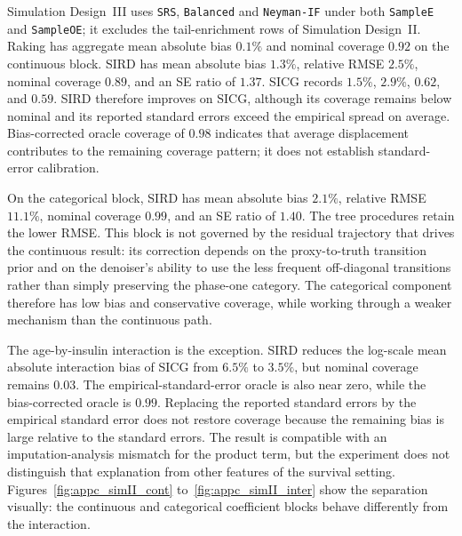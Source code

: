 Simulation Design~III uses \texttt{SRS}, \texttt{Balanced} and \texttt{Neyman-IF} under both \texttt{SampleE} and \texttt{SampleOE}; it excludes the tail-enrichment rows of Simulation Design~II. Raking has aggregate mean absolute bias \(0.1\%\) and nominal coverage \(0.92\) on the continuous block. SIRD has mean absolute bias \(1.3\%\), relative RMSE \(2.5\%\), nominal coverage \(0.89\), and an SE ratio of \(1.37\). SICG records \(1.5\%\), \(2.9\%\), \(0.62\), and \(0.59\). SIRD therefore improves on SICG, although its coverage remains below nominal and its reported standard errors exceed the empirical spread on average. Bias-corrected oracle coverage of \(0.98\) indicates that average displacement contributes to the remaining coverage pattern; it does not establish standard-error calibration.

On the categorical block, SIRD has mean absolute bias \(2.1\%\), relative RMSE \(11.1\%\), nominal coverage \(0.99\), and an SE ratio of \(1.40\). The tree procedures retain the lower RMSE. This block is not governed by the residual trajectory that drives the continuous result: its correction depends on the proxy-to-truth transition prior and on the denoiser's ability to use the less frequent off-diagonal transitions rather than simply preserving the phase-one category. The categorical component therefore has low bias and conservative coverage, while working through a weaker mechanism than the continuous path.

The age-by-insulin interaction is the exception. SIRD reduces the log-scale mean absolute interaction bias of SICG from \(6.5\%\) to \(3.5\%\), but nominal coverage remains \(0.03\). The empirical-standard-error oracle is also near zero, while the bias-corrected oracle is \(0.99\). Replacing the reported standard errors by the empirical standard error does not restore coverage because the remaining bias is large relative to the standard errors. The result is compatible with an imputation-analysis mismatch for the product term, but the experiment does not distinguish that explanation from other features of the survival setting. Figures~\ref{fig:appc_simII_cont} to~\ref{fig:appc_simII_inter} show the separation visually: the continuous and categorical coefficient blocks behave differently from the interaction.

